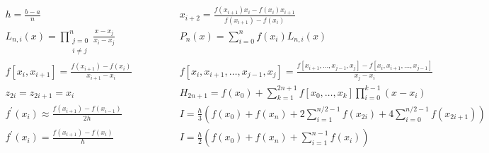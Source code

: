\documentclass[12pt]{article}
\begin{document}
{\large
\[
\begin{array}{cc}
h = \frac{b - a}{n} \qquad & \qquad
x_{i+2} = \frac{f(x_{i+1}){x_i}-f(x_{i}){x_{i+1}}}{f(x_{i+1}) - f(x_i)} \\
L_{n, i}(x) = \prod\limits_{\substack{j=0\\ i \neq j}}^n \frac{x - x_j}{x_i - x_j} \qquad & \qquad
P_n(x) = \sum\limits_{i = 0}^n f(x_i)L_{n,i}(x) \\
f\left[x_i, x_{i+1}\right] = \frac{f(x_{i+1})-f(x_i)}{x_{i+1}-x_i} \qquad & \qquad
f\left[ x_i, x_{i+1}, \ldots, x_{j-1}, x_j\right] = \frac{f\left[x_{i+1}, \ldots, x_{j-1}, x_j\right] - f\left[ x_i, x_{i+1}, \ldots, x_{j-1} \right]}{x_j - x_i} \\
z_{2i} = z_{2i+1} = x_i \qquad & \qquad
H_{2n+1} = f(x_0) + \sum\limits_{k=1}^{2n+1} f\left[x_0, \ldots, x_k\right] \prod\limits_{i = 0}^{k-1}(x-x_i)  \\
f^\prime(x_i) \approx \frac{f(x_{i+1}) - f(x_{i-1})}{2h} \qquad & \qquad
I = \frac{h}{3}\left( f(x_0) + f(x_n) + 2\sum\limits_{i=1}^{n/2-1}f(x_{2i}) + 4\sum\limits_{i=0}^{n/2-1}f(x_{2i+1}) \right) \\
f^\prime(x_i) = \frac{f(x_{i+1})-f(x_i)}{h} \qquad & \qquad
I = \frac{h}{2}\left( f(x_0) + f(x_n) + \sum\limits_{i = 1}^{n-1}f(x_i)\right)
\end{array}
\]
}
\end{document}
